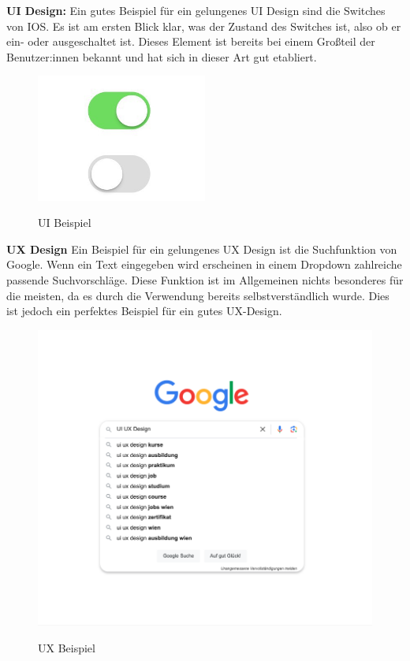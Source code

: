 \textbf{UI Design:}
\newline
Ein gutes Beispiel für ein gelungenes UI Design sind die Switches von IOS. Es ist am ersten Blick klar, was der Zustand des Switches ist, also ob er ein- oder ausgeschaltet ist. Dieses Element ist bereits bei einem Großteil der Benutzer:innen bekannt und hat sich in dieser Art gut etabliert.

\begin{figure}[h!]
    \centering
    \includegraphics[width=0.5\textwidth]{pics/ui-example.png}
    \caption{UI Beispiel}
    \cite{frontend_ui_ux}
    \label{fig:mesh1}
\end{figure}

\textbf{UX Design}
\newline
Ein Beispiel für ein gelungenes UX Design ist die Suchfunktion von Google. Wenn ein Text eingegeben wird erscheinen in einem Dropdown zahlreiche passende Suchvorschläge. Diese Funktion ist im Allgemeinen nichts besonderes für die meisten, da es durch die Verwendung bereits selbstverständlich wurde. Dies ist jedoch ein perfektes Beispiel für ein gutes UX-Design.

\newpage
\begin{figure}[h!]
    \centering
    \includegraphics[width=1\textwidth]{pics/ux-example.png}
    \caption{UX Beispiel}
    \cite{frontend_ui_ux}
    \label{fig:mesh1}
\end{figure}

\cite{frontend_ui_ux}